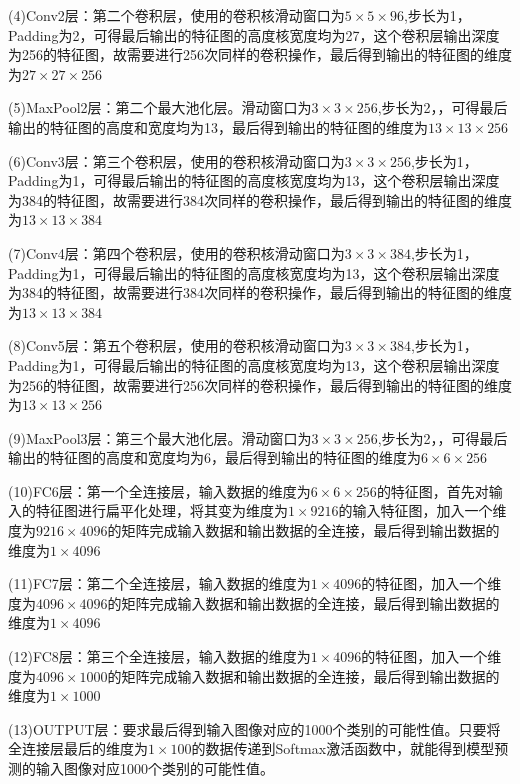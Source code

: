 \documentclass[openbib]{article}
\begin{document}
(4)Conv2层：第二个卷积层，使用的卷积核滑动窗口为$5\times5\times96$,步长为1，Padding为2，可得最后输出的特征图的高度核宽度均为27，这个卷积层输出深度为256的特征图，故需要进行256次同样的卷积操作，最后得到输出的特征图的维度为$27\times27\times256$

(5)MaxPool2层：第二个最大池化层。滑动窗口为$3\times3\times256$,步长为2，，可得最后输出的特征图的高度和宽度均为13，最后得到输出的特征图的维度为$13\times13\times256$

(6)Conv3层：第三个卷积层，使用的卷积核滑动窗口为$3\times3\times256$,步长为1，Padding为1，可得最后输出的特征图的高度核宽度均为13，这个卷积层输出深度为384的特征图，故需要进行384次同样的卷积操作，最后得到输出的特征图的维度为$13\times13\times384$

(7)Conv4层：第四个卷积层，使用的卷积核滑动窗口为$3\times3\times384$,步长为1，Padding为1，可得最后输出的特征图的高度核宽度均为13，这个卷积层输出深度为384的特征图，故需要进行384次同样的卷积操作，最后得到输出的特征图的维度为$13\times13\times384$

(8)Conv5层：第五个卷积层，使用的卷积核滑动窗口为$3\times3\times384$,步长为1，Padding为1，可得最后输出的特征图的高度核宽度均为13，这个卷积层输出深度为256的特征图，故需要进行256次同样的卷积操作，最后得到输出的特征图的维度为$13\times13\times256$

(9)MaxPool3层：第三个最大池化层。滑动窗口为$3\times3\times256$,步长为2，，可得最后输出的特征图的高度和宽度均为6，最后得到输出的特征图的维度为$6\times6\times256$

(10)FC6层：第一个全连接层，输入数据的维度为$6\times6\times256$的特征图，首先对输入的特征图进行扁平化处理，将其变为维度为$1\times9216$的输入特征图，加入一个维度为$9216\times4096$的矩阵完成输入数据和输出数据的全连接，最后得到输出数据的维度为$1\times4096$

(11)FC7层：第二个全连接层，输入数据的维度为$1\times4096$的特征图，加入一个维度为$4096\times4096$的矩阵完成输入数据和输出数据的全连接，最后得到输出数据的维度为$1\times4096$

(12)FC8层：第三个全连接层，输入数据的维度为$1\times4096$的特征图，加入一个维度为$4096\times1000$的矩阵完成输入数据和输出数据的全连接，最后得到输出数据的维度为$1\times1000$

(13)OUTPUT层：要求最后得到输入图像对应的1000个类别的可能性值。只要将全连接层最后的维度为$1\times100$的数据传递到Softmax激活函数中，就能得到模型预测的输入图像对应1000个类别的可能性值。
\end{document}
